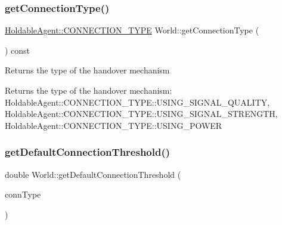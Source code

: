 \mbox{\label{class_world_a35aafc469b9146b4b6f72c6adaa3e067}} 
\subsubsection{\texorpdfstring{get\+Connection\+Type()}{getConnectionType()}}
{\footnotesize\ttfamily \hyperlink{class_holdable_agent_ae2c334b004d7b9c5a999cf2618e4e518}{Holdable\+Agent\+::\+C\+O\+N\+N\+E\+C\+T\+I\+O\+N\+\_\+\+T\+Y\+PE} World\+::get\+Connection\+Type (\begin{DoxyParamCaption}{ }\end{DoxyParamCaption}) const\hspace{0.3cm}{\ttfamily [private]}}

Returns the type of the handover mechanism \begin{DoxyReturn}{Returns}
the type of the handover mechanism\+: Holdable\+Agent\+::\+C\+O\+N\+N\+E\+C\+T\+I\+O\+N\+\_\+\+T\+Y\+P\+E\+::\+U\+S\+I\+N\+G\+\_\+\+S\+I\+G\+N\+A\+L\+\_\+\+Q\+U\+A\+L\+I\+TY, Holdable\+Agent\+::\+C\+O\+N\+N\+E\+C\+T\+I\+O\+N\+\_\+\+T\+Y\+P\+E\+::\+U\+S\+I\+N\+G\+\_\+\+S\+I\+G\+N\+A\+L\+\_\+\+S\+T\+R\+E\+N\+G\+TH, Holdable\+Agent\+::\+C\+O\+N\+N\+E\+C\+T\+I\+O\+N\+\_\+\+T\+Y\+P\+E\+::\+U\+S\+I\+N\+G\+\_\+\+P\+O\+W\+ER 
\end{DoxyReturn}
\mbox{\label{class_world_a5975f2673e84c87f8640737efd04590b}} 
\subsubsection{\texorpdfstring{get\+Default\+Connection\+Threshold()}{getDefaultConnectionThreshold()}}
{\footnotesize\ttfamily double World\+::get\+Default\+Connection\+Threshold (\begin{DoxyParamCaption}\item[{\hyperlink{class_holdable_agent_ae2c334b004d7b9c5a999cf2618e4e518}{Holdable\+Agent\+::\+C\+O\+N\+N\+E\+C\+T\+I\+O\+N\+\_\+\+T\+Y\+PE}}]{conn\+Type }\end{DoxyParamCaption})\hspace{0.3cm}{\ttfamily [private]}}

